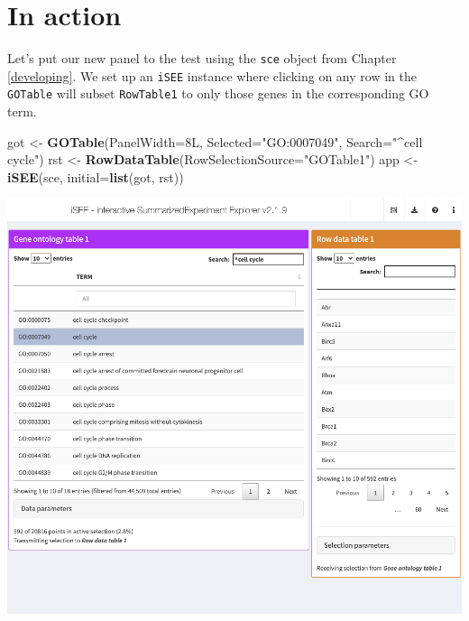 \documentclass[
]{book}
\newenvironment{Shaded}{\begin{snugshade}}{\end{snugshade}}
\newcommand{\ControlFlowTok}[1]{\textcolor[rgb]{0.13,0.29,0.53}{\textbf{#1}}}
\newcommand{\DataTypeTok}[1]{\textcolor[rgb]{0.13,0.29,0.53}{#1}}
\newcommand{\KeywordTok}[1]{\textcolor[rgb]{0.13,0.29,0.53}{\textbf{#1}}}
\newcommand{\NormalTok}[1]{#1}
\newcommand{\OperatorTok}[1]{\textcolor[rgb]{0.81,0.36,0.00}{\textbf{#1}}}
\newcommand{\StringTok}[1]{\textcolor[rgb]{0.31,0.60,0.02}{#1}}
\begin{document}
\begin{Shaded}
\end{Shaded}

\hypertarget{in-action}{%
\section{In action}\label{in-action}}

Let's put our new panel to the test using the \texttt{sce} object from Chapter \ref{developing}.
We set up an \texttt{iSEE} instance where clicking on any row in the \texttt{GOTable} will subset \texttt{RowTable1} to only those genes in the corresponding GO term.

\begin{Shaded}
\begin{Highlighting}[]
\NormalTok{got <-}\StringTok{ }\KeywordTok{GOTable}\NormalTok{(}\DataTypeTok{PanelWidth=}\NormalTok{8L, }\DataTypeTok{Selected=}\StringTok{"GO:0007049"}\NormalTok{, }\DataTypeTok{Search=}\StringTok{"^cell cycle"}\NormalTok{)}
\NormalTok{rst <-}\StringTok{ }\KeywordTok{RowDataTable}\NormalTok{(}\DataTypeTok{RowSelectionSource=}\StringTok{"GOTable1"}\NormalTok{)}
\NormalTok{app <-}\StringTok{ }\KeywordTok{iSEE}\NormalTok{(sce, }\DataTypeTok{initial=}\KeywordTok{list}\NormalTok{(got, rst))}
\end{Highlighting}
\end{Shaded}

\includegraphics[width=1\linewidth]{screenshots/go-table}
\end{document}
